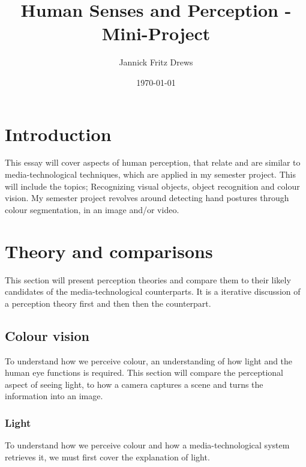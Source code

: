 \documentclass{article}
\title{Human Senses and Perception - Mini-Project}
\author{Jannick Fritz Drews}
\date{\today}
\begin{document}
\maketitle
\thispagestyle{empty} %
\newpage %


\section{Introduction}
\label{sec:Introduction}
This essay will cover aspects of human perception, that relate and are similar to media-technological techniques, which are applied in my semester project. This will include the topics; Recognizing visual objects, object recognition and colour vision. My semester project revolves around detecting hand postures through colour segmentation, in an image and/or video.
\section{Theory and comparisons}
\label{sec:Theory}
This section will present perception theories and compare them to their likely candidates of the media-technological counterparts. It is a iterative discussion of a perception theory first and then then the counterpart.

\subsection{Colour vision} %
To understand how we perceive colour, an understanding of how light and the human eye functions is required. This section will compare the perceptional aspect of seeing light, to how a camera captures a scene and turns the information into an image.

\subsubsection{Light}
To understand how we perceive colour and how a media-technological system retrieves it, we must first cover the explanation of light.\medskip\\
\end{document}
